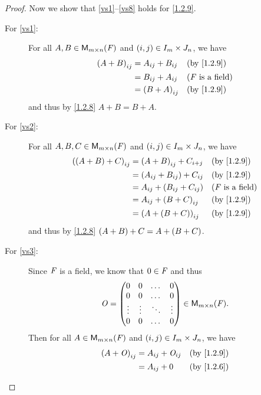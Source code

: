 \begin{proof}
	Now we show that \ref{vs1}--\ref{vs8} holds for \cref{1.2.9}.
	\begin{description}
		\item[For \ref{vs1}:]
			For all \(A, B \in \mathsf{M}_{{m} \times n}({\mathit{F}})\) and \(\left\lparen i, j\right\rparen \in I_{m} \times J_{n}\), we have
			\begin{align*}
				\p{A + B}_{i j} & = A_{i j} + B_{i j} &  & \text{(by \cref{1.2.9})}   \\
				                & = B_{i j} + A_{i j} &  & \text{(\(\F\) is a field)} \\
				                & = \p{B + A}_{i j}   &  & \text{(by \cref{1.2.9})}
			\end{align*}
			and thus by \cref{1.2.8} \(A + B = B + A\).
		\item[For \ref{vs2}:]
			For all \(A, B, C \in \mathsf{M}_{{m} \times n}({\mathit{F}})\) and \(\left\lparen i, j\right\rparen \in I_{m} \times J_{n}\), we have
			\begin{align*}
				\p{\p{A + B} + C}_{i j} & = \p{A + B}_{i j} + C_{i + j}     &  & \text{(by \cref{1.2.9})}   \\
				                        & = \p{A_{i j} + B_{i j}} + C_{i j} &  & \text{(by \cref{1.2.9})}   \\
				                        & = A_{i j} + \p{B_{i j} + C_{i j}} &  & \text{(\(\F\) is a field)} \\
				                        & = A_{i j} + \p{B + C}_{i j}       &  & \text{(by \cref{1.2.9})}   \\
				                        & = \p{A + \p{B + C}}_{i j}         &  & \text{(by \cref{1.2.9})}
			\end{align*}
			and thus by \cref{1.2.8} \(\left\lparen A + B\right\rparen + C = A + \left\lparen B + C\right\rparen\).
		\item[For \ref{vs3}:]
			Since \(\mathit{F}\) is a field, we know that \(0 \in \mathit{F}\) and thus
			\[
				\mathit{O} = \begin{pmatrix}
					0      & 0      & \dots  & 0      \\
					0      & 0      & \dots  & 0      \\
					\vdots & \vdots & \ddots & \vdots \\
					0      & 0      & \dots  & 0
				\end{pmatrix} \in \mathsf{M}_{{m} \times n}({\mathit{F}}).
			\]
			Then for all \(A \in \mathsf{M}_{{m} \times n}({\mathit{F}})\) and \(\left\lparen i, j\right\rparen \in I_{m} \times J_{n}\), we have
			\begin{align*}
				\p{A + \zm}_{i j} & = A_{i j} + \zm_{i j} &  & \text{(by \cref{1.2.9})}   \\
				                  & = A_{i j} + 0         &  & \text{(by \cref{1.2.6})}   \\

\end{align*}
\end{description}
\end{proof}
